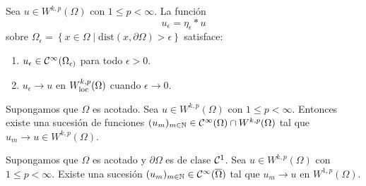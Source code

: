 \documentclass[../edp.tex]{subfiles}
\begin{document}
\begin{Teorema}
	Sea \(u\in W^{k,p}(\Omega)\) con \(1 \le p < \infty\). La función
	\begin{displaymath}
		u_{\epsilon} = \eta_{\epsilon}\ast u
	\end{displaymath}
	sobre \(\Omega_{\epsilon} = \left\{ x\in\Omega\mid
	\textrm{dist}(x,\partial\Omega) > \epsilon \right\}\) satisface:
	\begin{enumerate}[leftmargin=.3\textwidth, topsep=5pt, itemsep=2pt]
		\item
		\(u_{\epsilon} \in \mathcal{C}^{\infty}(\Omega_{\epsilon)}\) para todo
		\(\epsilon > 0\).

		\item
		\(u_{\epsilon} \to u\) en \(W^{k,p}_{\textrm{loc}}(\Omega)\) cuando
		\(\epsilon \to 0\).
	\end{enumerate}
\end{Teorema}

\begin{Teorema}
	Supongamos que \(\Omega\) es acotado. Sea \(u\in W^{k,p}(\Omega)\)
	con \(1 \le p < \infty\). Entonces existe una sucesión de
	funciones \((u_m)_{m\in\mathbb{N}} \in \mathcal{C}^{\infty}(\Omega)\cap
	W^{k,p}(\Omega)\) tal que \(u_m \to u \in W^{k,p}(\Omega)\).
\end{Teorema}

\begin{Teorema}
	Supongamos que \(\Omega\) es acotado y \(\partial\Omega\) es de
	clase \(\mathcal{C}^{1}\). Sea \(u\in W^{k,p}(\Omega)\) con \(1\le p <
	\infty\). Existe una sucesión \((u_m)_{m\in\mathbb{N}} \in
	\mathcal{C}^{\infty}(\overline\Omega)\) tal que \(u_m \to u\) en
	\(W^{1,p}(\Omega)\).
\end{Teorema}
\end{document}
